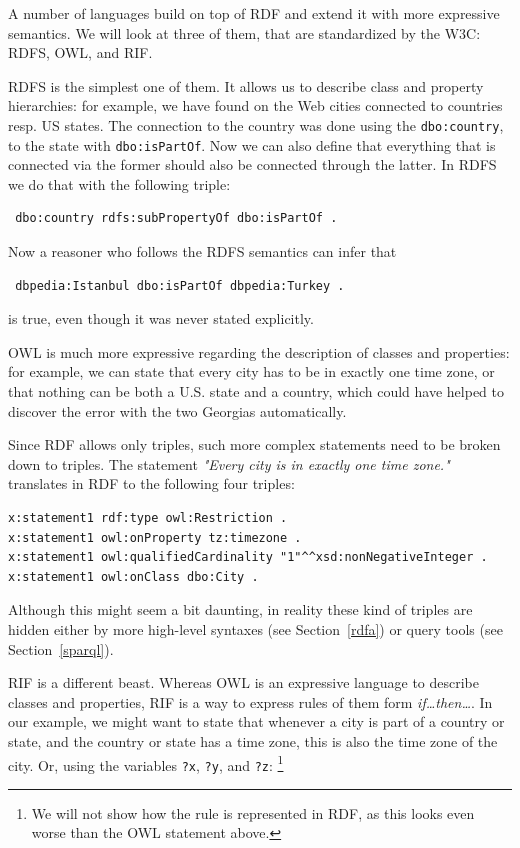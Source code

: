 A number of languages build on top of RDF and extend it with more expressive semantics.
We will look at three of them, that are standardized by the W3C: RDFS, OWL, and RIF.

RDFS is the simplest one of them.
It allows us to describe class and property hierarchies:
for example, we have found on the Web cities connected to countries resp. US states.
The connection to the country was done using the \texttt{dbo:country}, to the state with \texttt{dbo:isPartOf}.
Now we can also define that everything that is connected via the former should also be connected through the latter.
In RDFS we do that with the following triple:

\begin{verbatim}
 dbo:country rdfs:subPropertyOf dbo:isPartOf .
\end{verbatim}

Now a reasoner who follows the RDFS semantics can infer that

\begin{verbatim}
 dbpedia:Istanbul dbo:isPartOf dbpedia:Turkey .
\end{verbatim}

is true, even though it was never stated explicitly.

OWL is much more expressive regarding the description of classes and properties:
for example, we can state that every city has to be in exactly one time zone, or that nothing can be both a U.S. state and a country, which could have helped to discover the error with the two Georgias automatically.

Since RDF allows only triples, such more complex statements need to be broken down to triples.
The statement \textit{"Every city is in exactly one time zone."} translates in RDF to the following four triples:

\begin{verbatim}
x:statement1 rdf:type owl:Restriction .
x:statement1 owl:onProperty tz:timezone .
x:statement1 owl:qualifiedCardinality "1"^^xsd:nonNegativeInteger .
x:statement1 owl:onClass dbo:City .
\end{verbatim}

Although this might seem a bit daunting, in reality these kind of triples are hidden either by more high-level syntaxes (see Section~\ref{rdfa}) or query tools (see Section~\ref{sparql}).

RIF is a different beast.
Whereas OWL is an expressive language to describe classes and properties, RIF is a way to express rules of them form \textit{if\ldots{}then\ldots{}}.
In our example, we might want to state that whenever a city is part of a country or state, and the country or state has a time zone, this is also the time zone of the city. Or, using the variables \texttt{?x}, \texttt{?y}, and \texttt{?z}:%
\footnote{We will not show how the rule is represented in RDF, as this looks even worse than the OWL statement above.}

